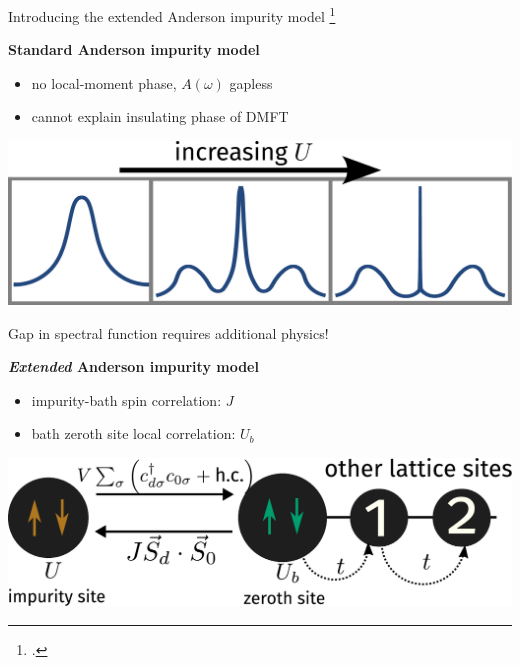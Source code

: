 \documentclass[8pt,aspectratio=169]{beamer}
\begin{document}
\begin{frame}{Introducing the extended Anderson impurity model}
\footcite{anderson_1961,anderson_1978,wilson1974,nozieres1974fermi,hrk_wilson_1980,andrei_1980,tsvelickKondoreview,hewson1993,costi_hewson_1990,costi2000,kuramoto1987,Cox1988,metzner_volhardt_1989,kotliar1996,parcollet_2004,maier_2005,kotliar_rmp_2006,ohashi_2008}

\begin{minipage}{0.5\textwidth}
{\bf Standard Anderson impurity model\\}
\begin{itemize}
	\item no local-moment phase, \(A(\omega)\) gapless
	\item cannot explain insulating phase of DMFT
\end{itemize}
\end{minipage}
\hspace*{\fill}
\begin{minipage}{0.45\textwidth}
\includegraphics[width=\textwidth]{standard-siam.pdf}
\end{minipage}

\vspace*{20pt}

\alert{Gap in spectral function requires additional physics!}

\vspace*{20pt}

\begin{minipage}{0.5\textwidth}
\textbf{{\it Extended} Anderson impurity model\\}
\begin{itemize}
\item impurity-bath spin correlation: \(J\)
\item bath zeroth site local correlation: \(U_b\)
\end{itemize}
\end{minipage}
\hspace*{\fill}
\begin{minipage}{0.48\textwidth}
\includegraphics[width=\textwidth]{zeromode_bare.pdf}
\end{minipage}

\end{frame}
\end{document}
